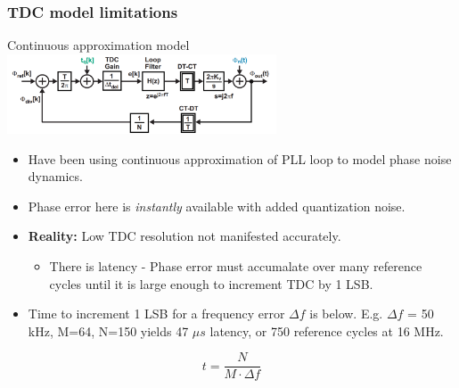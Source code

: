 \documentclass[t, screen, aspectratio=43]{beamer}
\begin{document}
\begin{frame}
	\frametitle{TDC model limitations}
	\begin{block}{Continuous approximation model}
		\vspace{-0.5em}
		\center\includegraphics[width=0.6\textwidth, angle=0]{pll_loop.png}
		\begin{itemize}
			\scriptsize
			\item Have been using continuous approximation of PLL loop to model phase noise dynamics.
			\item Phase error here is \textit{instantly} available with added quantization noise.
			\item \textbf{Reality:} Low TDC resolution not manifested accurately.
			\begin{itemize}
				\scriptsize
				\item There is latency - Phase error must accumalate over many reference cycles until it is large enough to increment TDC by 1 LSB. 
			\end{itemize}		
			\item Time to increment 1 LSB for a frequency error $\Delta f$ is below. E.g. $\Delta f$ = 50 kHz, M=64, N=150 yields 47 $\mu s$ latency, or 750 reference cycles at 16 MHz. 
		\end{itemize} 
		\scriptsize	
		\begin{equation}
			t = \frac{N}{M\cdot\Delta f}
		\end{equation}
	\end{block}
\end{frame}
\end{document}

